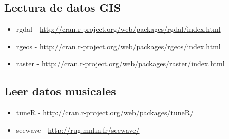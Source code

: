 \documentclass[
]{article}
\providecommand{\tightlist}{%
  \setlength{\itemsep}{0pt}\setlength{\parskip}{0pt}}
\begin{document}
\hypertarget{lectura-de-datos-gis}{%
\subsection{Lectura de datos GIS}\label{lectura-de-datos-gis}}

\begin{itemize}
\tightlist
\item
  rgdal - \url{http://cran.r-project.org/web/packages/rgdal/index.html}
\item
  rgeos - \url{http://cran.r-project.org/web/packages/rgeos/index.html}
\item
  raster -
  \url{http://cran.r-project.org/web/packages/raster/index.html}
\end{itemize}

\hypertarget{leer-datos-musicales}{%
\subsection{Leer datos musicales}\label{leer-datos-musicales}}

\begin{itemize}
\tightlist
\item
  tuneR - \url{http://cran.r-project.org/web/packages/tuneR/}
\item
  seewave - \url{http://rug.mnhn.fr/seewave/}
\end{itemize}
\end{document}
